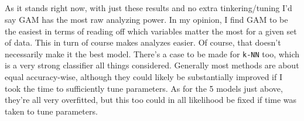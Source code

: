 \documentclass{article}
\begin{document}
\subsection{}
As it stands right now, with just these results and no extra tinkering/tuning I'd say GAM has the most raw analyzing power. In my opinion, I find GAM to be the easiest in terms of reading off which variables matter the most for a given set of data. This in turn of course makes analyzes easier. Of course, that doesn't necessarily make it the best model. There's a case to be made for \texttt{k-NN} too, which is a very strong classifier all things considered. Generally most methods are about equal accuracy-wise, although they could likely be substantially improved if I took the time to sufficiently tune parameters. As for the 5 models just above, they're all very overfitted, but this too could in all likelihood be fixed if time was taken to tune parameters.
\end{document}
